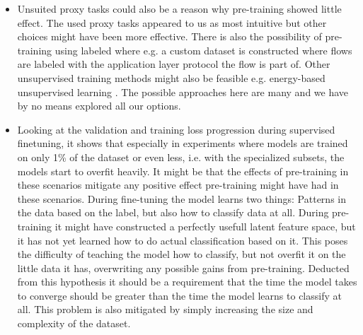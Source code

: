 \begin{itemize}
	\item Unsuited proxy tasks could also be a reason why pre-training showed little effect. The used proxy tasks appeared to us as most intuitive but other choices might have been more effective. There is also the possibility of pre-training using labeled where e.g. a custom dataset is constructed where flows are labeled with the application layer protocol the flow is part of. Other unsupervised training methods might also be feasible e.g. energy-based unsupervised learning \cite{energy_based_training}. The possible approaches here are many and we have by no means explored all our options.
	\item Looking at the validation and training loss progression during supervised finetuning, it shows that especially in experiments where models are trained on only 1\% of the dataset or even less, i.e. with the specialized subsets, the models start to overfit heavily. It might be that the effects of pre-training in these scenarios mitigate any positive effect pre-training might have had in these scenarios. During fine-tuning the model learns two things: Patterns in the data based on the label, but also how to classify data at all. During pre-training it might have constructed a perfectly usefull latent feature space, but it has not yet learned how to do actual classification based on it. This poses the difficulty of teaching the model how to classify, but not overfit it on the little data it has, overwriting any possible gains from pre-training. Deducted from this hypothesis it should be a requirement that the time the model takes to converge should be greater than the time the model learns to classify at all. This problem is also mitigated by simply increasing the size and complexity of the dataset.
\end{itemize}

